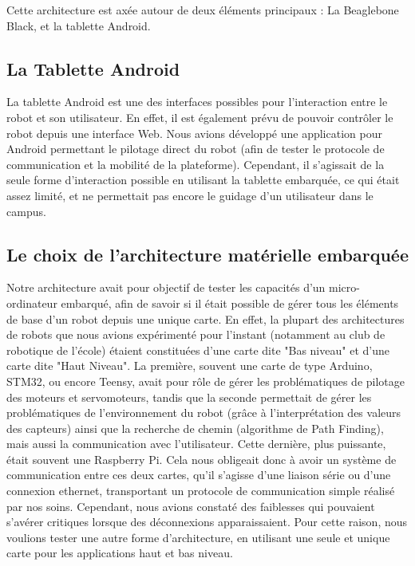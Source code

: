 \documentclass{report}
\begin{document}
    {Cette architecture est axée autour de deux éléments principaux :
    La Beaglebone Black, et la tablette Android.}

    \subsection{La Tablette Android}

    {La tablette Android est une des interfaces possibles pour l'interaction entre le robot
    et son utilisateur. En effet, il est également prévu de pouvoir contrôler le robot
    depuis une interface Web. Nous avions développé une application pour Android
    permettant le pilotage direct du robot (afin de tester le protocole de communication
    et la mobilité de la plateforme). Cependant, il s'agissait de la seule forme d'interaction
    possible en utilisant la tablette embarquée, ce qui était assez limité, et ne permettait
     pas encore le guidage d'un utilisateur dans le campus.}

     \subsection{Le choix de l'architecture matérielle embarquée}

     {Notre architecture avait pour objectif de tester les capacités d'un
     micro-ordinateur embarqué, afin de savoir si il était possible de gérer
     tous les éléments de base d'un robot depuis une unique carte. En effet,
     la plupart des architectures de robots que nous avions expérimenté pour l'instant
     (notamment au club de robotique de l'école) étaient constituées d'une carte
     dite "Bas niveau" et d'une carte dite "Haut Niveau". La première, souvent une carte
     de type Arduino, STM32, ou encore Teensy, avait pour rôle de gérer les
     problématiques de pilotage des moteurs et servomoteurs, tandis que la seconde
     permettait de gérer les problématiques de l'environnement du robot (grâce à l'interprétation
     des valeurs des capteurs) ainsi que la recherche de chemin (algorithme de Path Finding),
     mais aussi la communication avec l'utilisateur. Cette dernière, plus puissante,
     était souvent une Raspberry Pi. Cela nous obligeait donc à avoir
     un système de communication entre ces deux cartes, qu'il s'agisse d'une liaison série
     ou d'une connexion ethernet, transportant un protocole de communication simple réalisé
     par nos soins. Cependant, nous avions constaté des faiblesses qui pouvaient s'avérer
     critiques lorsque des déconnexions apparaissaient. Pour cette raison, nous voulions
     tester une autre forme d'architecture, en utilisant une seule et unique carte pour
     les applications haut et bas niveau.}
\end{document}
